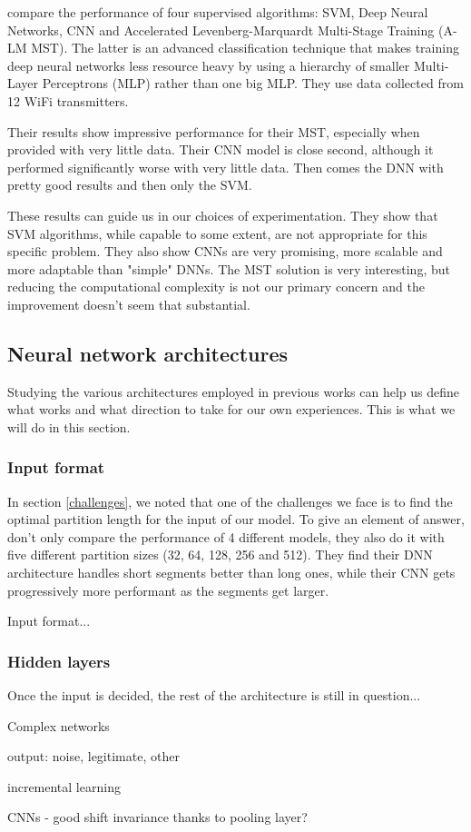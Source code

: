 \textcite{youssef_machine_2017} compare the performance of four supervised algorithms: SVM, Deep Neural Networks, CNN and Accelerated Levenberg-Marquardt Multi-Stage Training (A-LM MST). The latter is an advanced classification technique that makes training deep neural networks less resource heavy by using a hierarchy of smaller Multi-Layer Perceptrons (MLP) rather than one big MLP. They use data collected from 12 WiFi transmitters.

Their results show impressive performance for their MST, especially when provided with very little data. Their CNN model is close second, although it performed significantly worse with very little data. Then comes the DNN with pretty good results and then only the SVM.

These results can guide us in our choices of experimentation. They show that SVM algorithms, while capable to some extent, are not appropriate for this specific problem. They also show CNNs are very promising, more scalable and more adaptable than "simple" DNNs. The MST solution is very interesting, but reducing the computational complexity is not our primary concern and the improvement doesn't seem that substantial.

\subsection{Neural network architectures} \label{nn-architecture}

Studying the various architectures employed in previous works can help us define what works and what direction to take for our own experiences. This is what we will do in this section.

\subsubsection{Input format} \label{input-layer}

In section \ref{challenges}, we noted that one of the challenges we face is to find the optimal partition length for the input of our model. To give an element of answer, \textcite{youssef_machine_2017} don't only compare the performance of 4 different models, they also do it with five different partition sizes (32, 64, 128, 256 and 512). They find their DNN architecture handles short segments better than long ones, while their CNN gets progressively more performant as the segments get larger.

Input format...

\subsubsection{Hidden layers}

Once the input is decided, the rest of the architecture is still in question...

Complex networks

output: noise, legitimate, other

incremental learning

CNNs - good shift invariance thanks to pooling layer?
